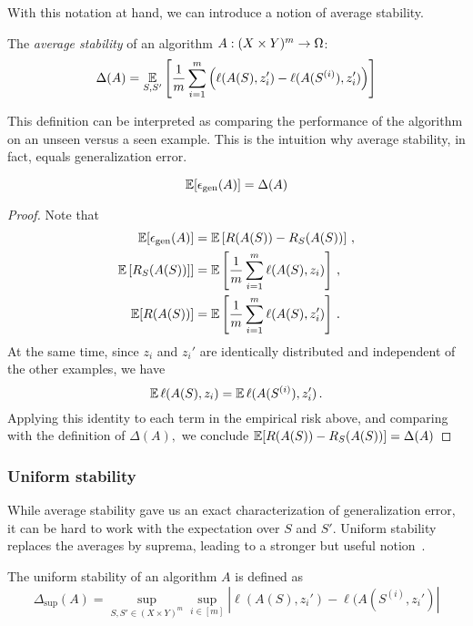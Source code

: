 With this notation at hand, we can introduce a notion of average stability.
\begin{definition} 
The \emph{average stability} of an algorithm $A: (X \times Y)^{m} \rightarrow \Omega$:
$$\Delta(A) = \operatorname*{\mathbb{E}}_{S,
S^{\prime}}\left[\frac{1}{m}\sum_{i=1}^{m}\left(\ell(A(S),z_i^{\prime}) -
\ell(A(S^{(i)}),z_{i}^{\prime})\right)\right]$$
\end{definition}
This definition can be interpreted as comparing the performance of the algorithm 
on an unseen versus a seen example. This is the intuition why average stability,
in fact, equals generalization error.
\begin{theorem}
$$\operatorname*{\mathbb{E}}[\epsilon_{\text{gen}}(A)] = \Delta(A)$$
\end{theorem}
\begin{proof}
Note that
\begin{align*}
\operatorname*{\mathbb{E}}[\epsilon_{\text{gen}}(A)] &= \operatorname*{\mathbb{E}}\left[R(A(S)) - R_{S}(A(S))\right]\,, \\
\operatorname*{\mathbb{E}}\left[R_{S}(A(S))\right]] &=
\operatorname*{\mathbb{E}}\left[\frac{1}{m}\sum_{i=1}^{m}\ell(A(S),z_i)\right]\,,\\
\operatorname*{\mathbb{E}} [R(A(S))]&=
\operatorname*{\mathbb{E}}\left[\frac{1}{m}\sum_{i=1}^{m}\ell(A(S),z_i^{\prime})\right]\,.
\end{align*}
At the same time, since $z_i$ and $z_i'$ are identically distributed and
independent of the other examples, we have
\[
\operatorname*{\mathbb{E}}\ell(A(S),z_i) = \operatorname*{\mathbb{E}}\ell(A(S^{(i)}),z_i^{\prime})\,.
\]
Applying this identity to each term in the empirical risk above, and comparing
with the definition of $\Delta(A),$ we conclude
$\operatorname*{\mathbb{E}}[R(A(S)) - R_S(A(S))] = \Delta(A)$
\end{proof}

\subsubsection{Uniform stability}
%
While average stability gave us an exact characterization of generalization
error, it can be hard to work with the expectation over $S$ and $S'.$ Uniform
stability replaces the averages by suprema, leading to a stronger but useful
notion~\cite{BousquettE02}.
%
\begin{definition}
The uniform stability of an algorithm $A$ is defined as 
\begin{equation*}
\Delta_{\sup}(A) = \sup_{S, S' \in (X\times Y)^m } 
\sup_{i \in [m]} |\ell(A(S), z_i') - \ell(A(S^{(i)}, z_i')|
\end{equation*}
\end{definition}

